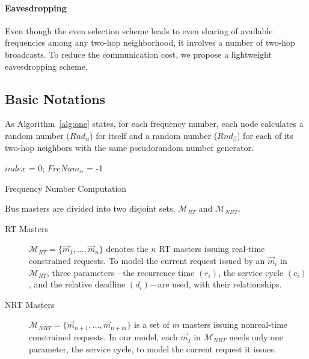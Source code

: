 \documentclass[prodmode,acmtecs]{acmsmall}
\begin{document}
\paragraph{Eavesdropping}

Even though the even selection scheme leads to even sharing of
available frequencies among any two-hop neighborhood, it involves a
number of two-hop broadcasts. To reduce the communication cost, we
propose a lightweight eavesdropping scheme.

\subsection{Basic Notations}

As Algorithm~\ref{alg:one} states, for each frequency
number, each node calculates a random number (${\textit{Rnd}}_{\alpha}$) for
itself and a random number (${\textit{Rnd}}_{\beta}$) for each of its two-hop
neighbors with the same pseudorandom number generator.
\begin{algorithm}[t]
\SetAlgoNoLine
{}
$index$ = 0; $FreNum_{\alpha}$ = -1\;
\caption{Frequency Number Computation}
\label{alg:one}
\end{algorithm}

Bus masters are divided into two disjoint sets, $\mathcal{M}_{RT}$
and $\mathcal{M}_{NRT}$.
\begin{description}
\item[RT Masters]
$\mathcal{M}_{RT}=\{ \vec{m}_{1},\dots,\vec{m}_{n}\}$ denotes the
$n$ RT masters issuing real-time constrained requests. To model the
current request issued by an $\vec{m}_{i}$ in $\mathcal{M}_{RT}$,
three parameters---the recurrence time $(r_i)$, the service cycle
$(c_i)$, and the relative deadline $(d_i)$---are used, with their
relationships.
\item[NRT Masters]
$\mathcal{M}_{NRT}=\{ \vec{m}_{n+1},\dots,\vec{m}_{n+m}\}$ is a set
of $m$ masters issuing nonreal-time constrained requests. In our
model, each $\vec{m}_{j}$ in $\mathcal{M}_{NRT}$ needs only one
parameter, the service cycle, to model the current request it
issues.
\end{description}
\end{document}
